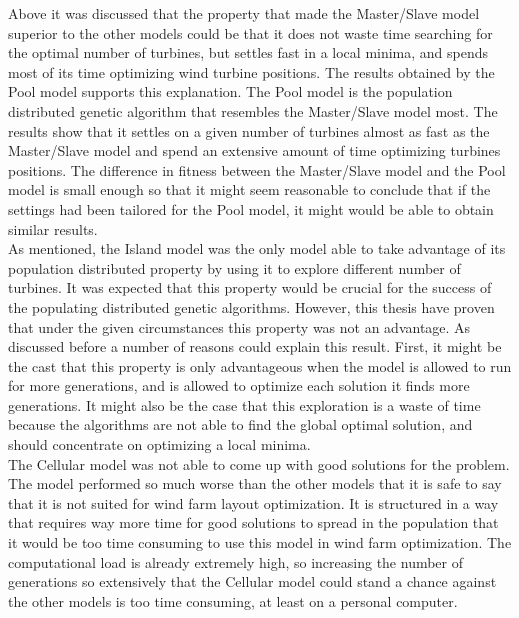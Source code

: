 \noindent Above it was discussed that the property that made the Master/Slave model superior to the other models could be that it does not waste time searching for the optimal number of turbines, but settles fast in a local minima, and spends most of its time optimizing wind turbine positions. The results obtained by the Pool model supports this explanation. The Pool model is the population distributed genetic algorithm that resembles the Master/Slave model most. The results show that it settles on a given number of turbines almost as fast as the Master/Slave model and spend an extensive amount of time optimizing turbines positions. The difference in fitness between the Master/Slave model and the Pool model is small enough so that it might seem reasonable to conclude that if the settings had been tailored for the Pool model, it might would be able to obtain similar results.\\


\noindent As mentioned, the Island model was the only model able to take advantage of its population distributed property by using it to explore different number of turbines. It was expected that this property would be crucial for the success of the populating distributed genetic algorithms. However, this thesis have proven that under the given circumstances this property was not an advantage. As discussed before a number of reasons could explain this result. First, it might be the cast that this property is only advantageous when the model is allowed to run for more generations, and is allowed to optimize each solution it finds more generations. It might also be the case that this exploration is a waste of time because the algorithms are not able to find the global optimal solution, and should concentrate on optimizing a local minima.\\


\noindent The Cellular model was not able to come up with good solutions for the problem. The model performed so much worse than the other models that it is safe to say that it is not suited for wind farm layout optimization. It is structured in a way that requires way more time for good solutions to spread in the population that it would be too time consuming to use this model in wind farm optimization. The computational load is already extremely high, so increasing the number of generations so extensively that the Cellular model could stand a chance against the other models is too time consuming, at least on a personal computer. \\


